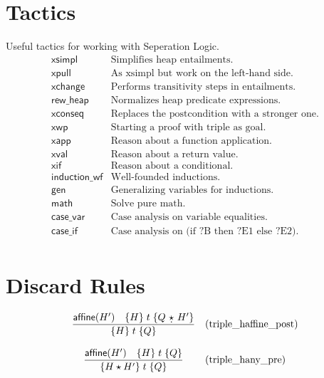 \documentclass[10pt,a4paper]{article}
\newcommand{\qstar}{\text{ \d{$\star$} }} %
\newcommand{\haffine}[1]{\mathsf{affine}(#1)}
\newcommand{\triple}[3]{\{#2\}\;#1\;\{#3\}}
\begin{document}
\begin{multicols}{2}
\section*{Tactics}
Useful tactics for working with Seperation Logic.
\[
\begin{array}{ll}
  \mathsf{xsimpl} &  \text{Simplifies heap entailments.} \\
  \mathsf{xpull} & \text{As xsimpl but work on the left-hand side.} \\
  \mathsf{xchange} & \text{Performs transitivity steps in entailments.} \\
  \mathsf{rew\_heap} & \text{Normalizes heap predicate expressions.} \\
  \mathsf{xconseq} & \text{Replaces the postcondition with a stronger one.} \\
  \mathsf{xwp} & \text{Starting a proof with triple as goal.} \\
  \mathsf{xapp} & \text{Reason about a function application.} \\
  \mathsf{xval} & \text{Reason about a return value.} \\
  \mathsf{xif} & \text{Reason about a conditional.} \\
  \mathsf{induction\_wf} & \text{Well-founded inductions.} \\
   \mathsf{gen} & \text{Generalizing variables for inductions.} \\
  \mathsf{math} & \text{Solve pure math.} \\
  \mathsf{case\_var} & \text{Case analysis on variable equalities.} \\
  \mathsf{case\_if} & \text{Case analysis on (if ?B then ?E1 else ?E2).} \\
\end{array}
\]

\section*{Discard Rules}
\[
  \begin{array}{cl}
  \dfrac{\haffine{H'} \quad \triple{t}{H}{Q \qstar H'}}
  {\triple{t}{H}{Q}} & \text{(triple\_haffine\_post)} \\
 \\
  \dfrac{\haffine{H'} \quad \triple{t}{H}{Q}}
  {\triple{t}{H \star H'}{Q}} & \text{(triple\_hany\_pre)} \\
  \\
  \end{array}
\]


\end{multicols}
\end{document}
